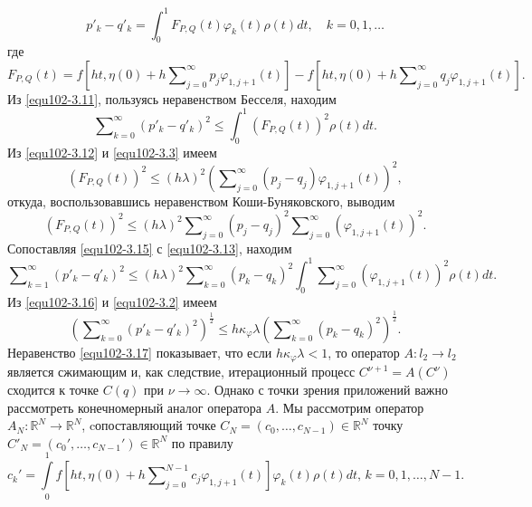 \begin{equation}\label{equ102-3.11}
p'_k-q'_k=\int_{0}^1F_{P,Q}(t)\varphi_k(t)\rho(t)dt,\quad k=0,1,\ldots
\end{equation}
где
\begin{equation}\label{equ102-3.12}
 F_{P,Q}(t)=f\left[ht,\eta(0)+ h\sum\nolimits_{j=0}^\infty p_j\varphi_{1,j+1}(t)\right] 
  -f\left[ht,\eta(0)+ h\sum\nolimits_{j=0}^\infty q_j\varphi_{1,j+1}(t)\right].
\end{equation}
Из \eqref{equ102-3.11}, пользуясь неравенством Бесселя, находим
 \begin{equation}\label{equ102-3.13}
\sum\nolimits_{k=0}^\infty (p'_k-q'_k)^2\le\int_{0}^1(F_{P,Q}(t))^2\rho(t) dt.
\end{equation}
Из \eqref{equ102-3.12} и \eqref{equ102-3.3}  имеем
 \begin{equation}\label{equ102-3.15}
(F_{P,Q}(t))^2\le (h\lambda)^2   \left(\sum\nolimits_{j=0}^\infty( p_j-q_j)\varphi_{1,j+1}(t)\right)^2,
\end{equation}
откуда,  воспользовавшись неравенством Коши-Буняковского, выводим
$$
(F_{P,Q}(t))^2\le(h\lambda)^2   \sum\nolimits_{j=0}^\infty( p_j-q_j)^2\sum\nolimits_{j=0}^\infty(\varphi_{1,j+1}(t))^2.
$$
Сопоставляя \eqref{equ102-3.15} с \eqref{equ102-3.13}, находим
\begin{equation}\label{equ102-3.16}
\sum\nolimits_{k=1}^\infty (p'_k-q'_k)^2\le(h\lambda)^2 \sum\nolimits_{k=0}^\infty( p_k-q_k)^2\int_{0}^1 \sum\nolimits_{j=0}^\infty(\varphi_{1,j+1}(t))^2\rho(t) dt.
\end{equation}
Из  \eqref{equ102-3.16}  и \eqref{equ102-3.2} имеем
\begin{equation}\label{equ102-3.17}
\left(\sum\nolimits_{k=0}^\infty (p'_k-q'_k)^2\right)^\frac12\le h\kappa_\varphi\lambda \left(\sum\nolimits_{k=0}^\infty (p_k-q_k)^2\right)^\frac12. \end{equation}
Неравенство \eqref{equ102-3.17} показывает, что если $h\kappa_\varphi\lambda<1$, то оператор  $A:l_2\to l_2$ является сжимающим и, как следствие, итерационный процесс $C^{\nu+1}=A(C^{\nu})$  сходится к точке $C(q)$ при $\nu\to\infty$. Однако с точки зрения приложений важно рассмотреть конечномерный аналог оператора $A$. Мы рассмотрим оператор $A_N:\mathbb{R}^N\to \mathbb{R}^N$, cопоставляющий точке
$C_N=(c_0,\ldots,c_{N-1})\in \mathbb{R}^N $ точку  $C'_N=(c_0',\ldots,c_{N-1}')\in \mathbb{R}^N $ по правилу
\begin{equation}\label{equ102-3.18}
c_k'=\int\limits_{0}^1f\left[ht,\eta(0)+ h\sum\nolimits_{j=0}^{N-1} c_j\varphi_{1,j+1}(t)\right]\varphi_k(t)\rho(t) dt,\,k=0,1,\ldots, N-1.
\end{equation}
